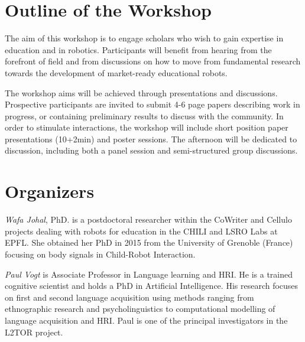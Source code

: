 \documentclass{sig-alternate-05-2015}
\begin{document}

\section{Outline of the Workshop}
The aim of this workshop is to engage scholars who wish to gain expertise in 
education and in robotics. Participants will benefit from hearing from the 
forefront of field and from discussions on how to move from fundamental research 
towards the development of market-ready educational robots.

The workshop aims will be achieved through presentations and discussions. 
Prospective participants are invited to submit 4-6 page papers describing work in progress, or containing preliminary results to discuss with the community.
In order to stimulate interactions, the workshop will include short position paper presentations (10+2min) and poster sessions. 
The afternoon will be dedicated to discussion, including both a panel session and semi-structured group discussions.


\section{Organizers}
\emph{Wafa Johal}, PhD. is a postdoctoral researcher within the CoWriter and Cellulo projects dealing with robots for education in the CHILI and LSRO Labs at EPFL. She obtained her PhD in 2015 from the University of Grenoble (France) focusing on body signals in Child-Robot Interaction.  

\emph{Paul Vogt} is Associate Professor in Language learning and HRI. He is a trained cognitive scientist and holds a PhD in Artificial Intelligence. His research focuses on first and second language acquisition using methods ranging from ethnographic research and psycholinguistics to computational modelling of language acquisition and HRI. Paul is one of the principal investigators in the L2TOR project.
\end{document}
